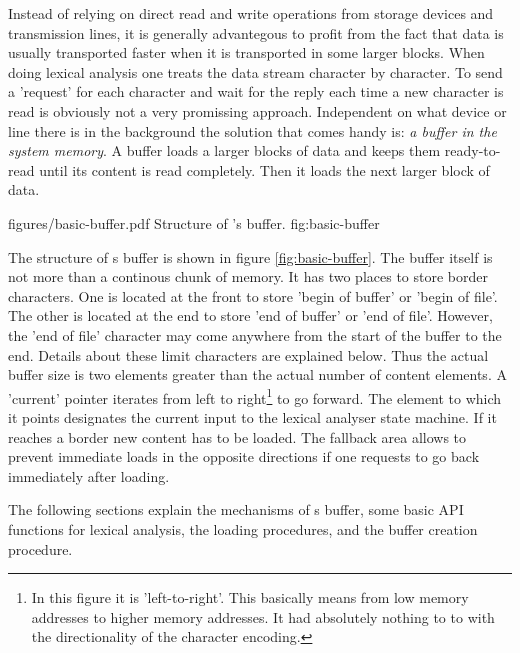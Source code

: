 \vskip 0.2cm

Instead of relying on direct read and write operations from storage devices and
transmission lines, it is generally advantegous to profit from the fact that
data is usually transported faster when it is transported in some larger
blocks.  When doing lexical analysis one treats the data stream character by
character. To send a 'request' for each character and wait for the reply each
time a new character is read is obviously not a very promissing approach.
Independent on what device or line there is in the background the solution that
comes handy is: {\it a buffer in the system memory}. A buffer loads a larger
blocks of data and keeps them ready-to-read until its content is read completely. Then
it loads the next larger block of data.

\showpic
{figures/basic-buffer.pdf}
{Structure of {\quex}'s buffer.}
{fig:basic-buffer}

The structure of {\quex}s buffer is shown in figure \ref{fig:basic-buffer}. The buffer itself
is not more than a continous chunk of memory. It has two places to store
border characters. One is located at the front to store 'begin of buffer' or 'begin of
file'. The other is located at the end to store 'end of buffer' or 'end of file'.
However, the 'end of file' character may come anywhere from the start of the
buffer to the end. Details about these limit characters are explained below.
Thus the actual buffer size is two elements greater than the actual number
of content elements. A 'current' pointer iterates from left to right\footnote{In this figure
it is 'left-to-right'. This basically means from low memory addresses to 
higher memory addresses. It had absolutely nothing to to with the directionality
of the character encoding.} to go forward. The element to which it points designates
the current input to the lexical analyser state machine. If it reaches a border
new content has to be loaded. The fallback area allows to prevent immediate
loads in the opposite directions if one requests to go back immediately
after loading.

The following sections explain the mechanisms of {\quex}s buffer, some
basic API functions for lexical analysis, the loading procedures, and the
buffer creation procedure.


